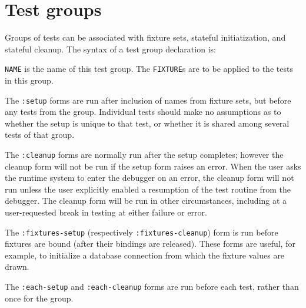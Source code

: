 
\section{Test groups}
\label{sec:groups}
Groups of tests can be
associated with fixture sets, stateful initiatization, and stateful
cleanup.  The syntax of a test group declaration
is:

%
\texttt{NAME} is the name of this test group.  The \texttt{FIXTURE}s
are to be applied to the tests in this group.

The \texttt{:setup} forms are run after
inclusion of names from fixture sets, but before any tests from the
group.  Individual tests should make no assumptions as to whether the
setup is unique to that test, or whether it is shared among several
tests of that group.  

The \texttt{:cleanup} forms are
normally run after the setup completes; however the cleanup form will
not be run if the setup form raises an error.  When the user asks the
runtime system to enter the debugger on an error, the cleanup form
will not run unless the user explicitly enabled a resumption of the
test routine from the debugger.  The cleanup form will be run in other
circumstances, including at a user-requested break in testing at
either failure or error.

The
\texttt{:fixtures-setup}
(respectively
\texttt{:fixtures-cleanup})
form is run before fixtures are bound (after their bindings are
released).  These forms are useful, for example, to initialize a
database connection from which the fixture values are drawn.

The \texttt{:each-setup}
and \texttt{:each-cleanup}
forms are run before each test, rather than once for the group.

